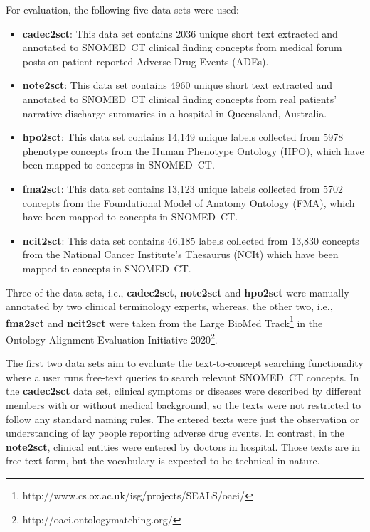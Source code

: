 \documentclass[preprint,12pt]{elsarticle}
\begin{document}
For evaluation, the following five data sets were used:
\begin{itemize}[noitemsep,topsep=0pt,parsep=0pt,partopsep=0pt]
  \item \textbf{cadec2sct}: This data set contains 2036 unique short text extracted and annotated to SNOMED~CT clinical finding concepts from medical forum posts on patient reported Adverse Drug Events (ADEs)\cite{Sarnaz2015}.
  \item \textbf{note2sct}: This data set contains 4960 unique short text extracted and annotated to SNOMED~CT clinical finding concepts from real patients' narrative discharge summaries in a hospital in Queensland, Australia.
  \item \textbf{hpo2sct}: This data set contains 14,149 unique labels collected from 5978 phenotype concepts from the Human Phenotype Ontology (HPO), which have been mapped to concepts in SNOMED~CT.
  \item \textbf{fma2sct}: This data set contains 13,123 unique labels collected from 5702 concepts from the Foundational Model of Anatomy Ontology (FMA), which have been mapped to concepts in SNOMED~CT.
  \item \textbf{ncit2sct}: This data set contains 46,185 labels collected from 13,830 concepts from the National Cancer Institute's Thesaurus (NCIt) which have been mapped to concepts in SNOMED~CT.
\end{itemize}

Three of the data sets, i.e., \textbf{cadec2sct}, \textbf{note2sct} and \textbf{hpo2sct} were manually annotated by two clinical terminology experts, whereas, the other two, i.e., \textbf{fma2sct} and \textbf{ncit2sct} were taken from the Large BioMed Track\footnote{http://www.cs.ox.ac.uk/isg/projects/SEALS/oaei/} in the Ontology Alignment Evaluation Initiative 2020\footnote{http://oaei.ontologymatching.org/}.

The first two data sets aim to evaluate the text-to-concept searching functionality where a user runs free-text queries to search relevant SNOMED~CT concepts. In the \textbf{cadec2sct} data set, clinical symptoms or diseases were described by different members with or without medical background, so the texts were not restricted to follow any standard naming rules. The entered texts were just the observation or understanding of lay people reporting adverse drug events. In contrast, in the \textbf{note2sct}, clinical entities were entered by doctors in hospital. Those texts are in free-text form, but the vocabulary is expected to be technical in nature. 
\end{document}
